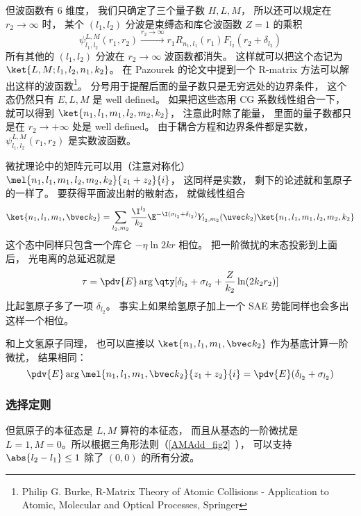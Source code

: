 但波函数有 6 维度， 我们只确定了三个量子数 $H,L,M$， 所以还可以规定在 $r_2\to\infty$ 时， 某个 $(l_1,l_2)$ 分波是束缚态和库仑波函数 $Z=1$ 的乘积
\begin{equation}
\psi_{l_1,l_2}^{L, M}(r_1, r_2) \overset{r_2\to\infty}{\longrightarrow} r_1 R_{n_1,l_1}(r_1) F_{l_2}(r_2 + \delta_{l_2})
\end{equation}
所有其他的 $(l_1,l_2)$ 分波在 $r_2\to\infty$ 波函数都消失。 这样就可以把这个态记为 $\ket{L,M; l_1,l_2, n_1, k_2}$。 在 Pazourek 的论文中提到一个 R-matrix 方法可以解出这样的波函数\footnote{Philip G. Burke, R-Matrix Theory of Atomic Collisions - Application to Atomic, Molecular and Optical Processes, Springer}。 分号用于提醒后面的量子数只是无穷远处的边界条件， 这个态仍然只有 $E,L,M$ 是 well defined。 如果把这些态用 CG 系数线性组合一下， 就可以得到 $\ket{n_1,l_1,m_1, l_2,m_2,k_2}$， 注意此时除了能量， 里面的量子数都只是在 $r_2\to+\infty$ 处是 well defined。 由于耦合方程和边界条件都是实数， $\psi_{l_1,l_2}^{L, M}(r_1, r_2)$ 是实数波函数。

微扰理论中的矩阵元可以用（注意对称化） $\mel{n_1,l_1,m_1, l_2,m_2,k_2}{z_1 + z_2}{i}$， 这同样是实数， 剩下的论述就和氢原子的一样了。 要获得平面波出射的散射态， 就做线性组合
\begin{equation}
\ket{n_1, l_1, m_1, \bvec k_2} = \sum_{l_2,m_2}\frac{\I^{l_2}}{k_2} \E^{-\I(\sigma_{l_2}+\delta_{l_2})} Y_{l_2,m_2} (\uvec k_2) \ket{n_1,l_1,m_1, l_2,m_2,k_2}
\end{equation}
这个态中同样只包含一个库仑 $-\eta\ln 2kr$ 相位。 把一阶微扰的末态投影到上面后， 光电离的总延迟就是
\begin{equation}
\tau = \pdv{E} \arg\qty[\delta_{l_2} + \sigma_{l_2} + \frac{Z}{k_2}\ln(2k_2 r_2)] %
\end{equation}
比起氢原子多了一项 $\delta_{l_2}$。 事实上如果给氢原子加上一个 SAE 势能同样也会多出这样一个相位。

和上文氢原子同理， 也可以直接以 $\ket{n_1, l_1, m_1, \bvec k_2}$ 作为基底计算一阶微扰， 结果相同：
\begin{equation}
\pdv{E} \arg\mel{n_1, l_1, m_1, \bvec k_2}{z_1 + z_2}{i} = \pdv{E} (\delta_{l_2} + \sigma_{l_2})
\end{equation}

\subsubsection{选择定则}
但氦原子的本征态是 $L,M$ 算符的本征态， 而且从基态的一阶微扰是 $L = 1, M = 0$。所以根据三角形法则（\autoref{AMAdd_fig2}~）， 可以支持 $\abs{l_2 - l_1} \le 1$ 除了 $(0,0)$ 的所有分波。

